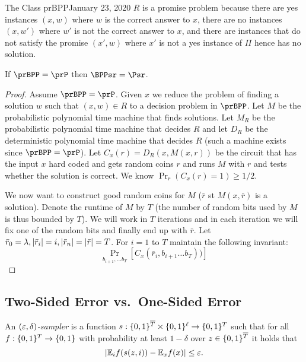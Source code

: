 \begin{lecture}{1}{The Class prBPP}{January 23, 2020}
$R$ is a promise problem because there are yes instances $(x,w)$ where $w$ is the correct answer to $x$, there are no instances $(x,w')$ where $w'$ is not the correct answer to $x$, and there are instances that do not satisfy the promise $(x',w)$ where $x'$ is not a yes instance of $\Pi$ hence has no solution.

\begin{theorem}
	If $\prBPP = \prP$ then $\BPPsr = \Psr$.
\end{theorem}
\begin{proof}
	Assume $\prBPP=\prP$. Given $x$ we reduce the problem of finding a solution $w$ such that $(x,w) \in R$ to a decision problem in $\prBPP$. Let $M$ be the probabilistic polynomial time machine that finds solutions. Let $M_R$ be the probabilistic polynomial time machine that decides $R$ and let $D_R$ be the deterministic polynomial time machine that decides $R$ (such a machine exists since $\prBPP=\prP$). 
	Let $C_x(r)= D_R(x, M(x,r))$ be the circuit that has the input $x$ hard coded and gets random coins $r$ and runs $M$ with $r$ and tests whether the solution is correct. We know $\Pr_r(C_x(r)=1) \geq 1/2$.
	
	We now want to construct good random coins for $M$ ($\bar{r}$ st $M(x,\bar{r})$ is a solution). Denote the runtime of $M$ by $T$ (the number of random bits used by $M$ is thus bounded by $T$). We will work in $T$ iterations and in each iteration we will fix one of the random bits and finally end up with $\bar{r}$. Let $\bar{r}_0 = \lambda, \lvert\bar{r}_i\rvert=i, \lvert\bar{r}_n\rvert = \lvert\bar{r}\rvert = T$.
	For $i=1$ to $T$ maintain the following invariant:
	\[
		\Pr_{b_{i+1},\ldots b_T}[C_x(\bar{r}_i, b_{i+1} \ldots b_T))]
	\]
	
	
\end{proof}






\subsection{Two-Sided Error vs.\ One-Sided Error}


\begin{definition}
  An \emph{$(\varepsilon, \delta)$-sampler} is a function $s :
  \{0,1\}^{\overline{T}} \times \{0,1\}^\ell \to \{0,1\}^T$ such that for
  all $f : \{0,1\}^T \to \{0,1\}$ with probability at least $1 - \delta$ 
  over $z \in \{0,1\}^{\overline{T}}$ it holds that \[
    |\mathbb{E}_i f(s(z, i)) - \mathbb{E}_x f(x)| \le \varepsilon.
  \]
\end{definition}


\end{lecture}
